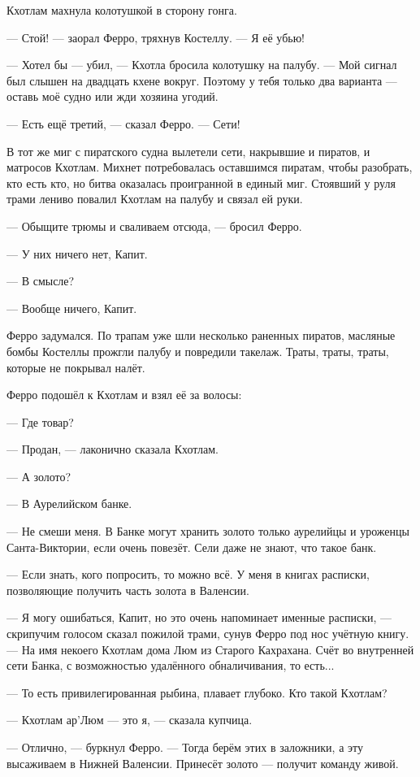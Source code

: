 Кхотлам махнула колотушкой в сторону гонга.

--- Стой! --- заорал Ферро, тряхнув Костеллу.
--- Я её убью!

--- Хотел бы --- убил, --- Кхотла бросила колотушку на палубу.
--- Мой сигнал был слышен на двадцать кхене вокруг.
Поэтому у тебя только два варианта --- оставь моё судно или жди хозяина угодий.

--- Есть ещё третий, --- сказал Ферро.
--- Сети!

В тот же миг с пиратского судна вылетели сети, накрывшие и пиратов, и матросов Кхотлам.
Михнет потребовалась оставшимся пиратам, чтобы разобрать, кто есть кто, но битва оказалась проигранной в единый миг.
Стоявший у руля трами лениво повалил Кхотлам на палубу и связал ей руки.

--- Обыщите трюмы и сваливаем отсюда, --- бросил Ферро.

--- У них ничего нет, Капит.

--- В смысле?

--- Вообще ничего, Капит.

Ферро задумался.
По трапам уже шли несколько раненных пиратов, масляные бомбы Костеллы прожгли палубу и повредили такелаж.
Траты, траты, траты, которые не покрывал налёт.

Ферро подошёл к Кхотлам и взял её за волосы:

--- Где товар?

--- Продан, --- лаконично сказала Кхотлам.

--- А золото?

--- В Аурелийском банке.

--- Не смеши меня.
В Банке могут хранить золото только аурелийцы и уроженцы Санта-Виктории, если очень повезёт.
Сели даже не знают, что такое банк.

--- Если знать, кого попросить, то можно всё.
У меня в книгах расписки, позволяющие получить часть золота в Валенсии.

--- Я могу ошибаться, Капит, но это очень напоминает именные расписки, --- скрипучим голосом сказал пожилой трами, сунув Ферро под нос учётную книгу.
--- На имя некоего Кхотлам дома Люм из Старого Кахрахана.
Счёт во внутренней сети Банка, с возможностью удалённого обналичивания, то есть...

--- То есть привилегированная рыбина, плавает глубоко.
Кто такой Кхотлам?

--- Кхотлам ар'Люм --- это я, --- сказала купчица.

--- Отлично, --- буркнул Ферро.
--- Тогда берём этих в заложники, а эту высаживаем в Нижней Валенсии.
Принесёт золото --- получит команду живой.

